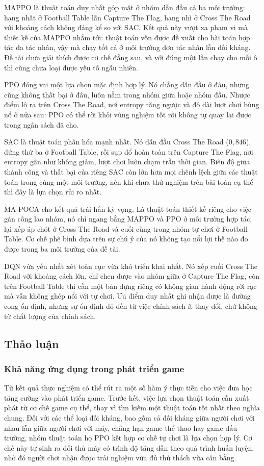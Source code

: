 \indent MAPPO là thuật toán duy nhất góp mặt ở nhóm dẫn đầu cả ba môi trường: hạng nhất ở
Football Table lẫn Capture The Flag, hạng nhì ở Cross The Road với khoảng cách không đáng
kể so với SAC. Kết quả này vượt xa phạm vi mà thiết kế của MAPPO nhắm tới: thuật toán vốn
được đề xuất cho bài toán hợp tác đa tác nhân, vậy mà chạy tốt cả ở môi trường đơn tác
nhân lẫn đối kháng. Đề tài chưa giải thích được cơ chế đằng sau, và với đúng một lần chạy
cho mỗi ô thì cũng chưa loại được yếu tố ngẫu nhiên.

\indent PPO đóng vai một lựa chọn mặc định hợp lý. Nó chẳng dẫn đầu ở đâu, nhưng cũng
không thất bại ở đâu, luôn nằm trong nhóm giữa hoặc nhóm đầu. Nhược điểm lộ ra trên Cross
The Road, nơi entropy tăng ngược và độ dài lượt chơi bùng nổ ở nửa sau: PPO có thể rời
khỏi vùng nghiệm tốt rồi không tự quay lại được trong ngân sách đã cho.

\indent SAC là thuật toán phân hóa mạnh nhất. Nó dẫn đầu Cross The Road ($0{,}846$), đứng
thứ ba ở Football Table, rồi sụp đổ hoàn toàn trên Capture The Flag, nơi entropy gần như không
giảm, lượt chơi luôn chạm trần thời gian. Biên độ giữa thành công và thất bại của
riêng SAC còn lớn hơn mọi chênh lệch giữa các thuật toán trong cùng một môi trường, nên
khi chưa thử nghiệm trên bài toán cụ thể thì đây là lựa chọn rủi ro nhất.

\indent MA-POCA cho kết quả trái hẳn kỳ vọng. Là thuật toán thiết kế riêng cho việc gán
công lao nhóm, nó chỉ ngang bằng MAPPO và PPO ở môi trường hợp tác, lại xếp áp chót ở Cross
The Road và cuối cùng trong nhóm tự chơi ở Football Table. Cơ chế phê bình dựa trên sự chú
ý của nó không tạo nổi lợi thế nào đo được trong ba môi trường của đề tài.

\indent DQN vừa yếu nhất xét toàn cục vừa khó triển khai nhất. Nó xếp cuối Cross The Road
với khoảng cách lớn, chỉ chen được vào nhóm giữa ở Capture The Flag, còn trên Football
Table thì cần một bản dựng riêng có không gian hành động rời rạc mà vẫn không ghép nổi với
tự chơi. Ưu điểm duy nhất ghi nhận được là đường cong ổn định, nhưng sự ổn định đó đến từ việc
chính sách ít thay đổi, chứ không từ chất lượng của chính sách.

\subsection{Thảo luận}

\subsubsection{Khả năng ứng dụng trong phát triển game}
\indent Từ kết quả thực nghiệm có thể rút ra một số hàm ý thực tiễn cho việc đưa học tăng
cường vào phát triển game. Trước hết, việc lựa chọn thuật toán cần xuất phát từ cơ chế
game cụ thể, thay vì tìm kiếm một thuật toán tốt nhất theo nghĩa chung. Đối với các thể
loại đối kháng, bao gồm cả đối kháng giữa người chơi với nhau lẫn giữa người chơi với máy,
chẳng hạn game thể thao hay game đấu trường, nhóm thuật toán họ PPO kết hợp cơ chế tự chơi
là lựa chọn hợp lý. Cơ chế này tự sinh ra đối thủ máy có trình độ tăng dần theo quá trình
huấn luyện, nhờ đó người chơi nhận được trải nghiệm vừa đủ thử thách vừa cân bằng.

